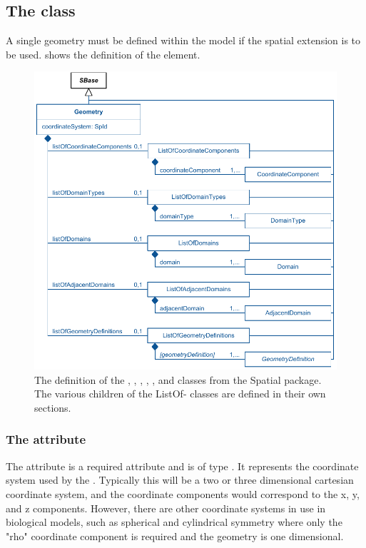 \subsection{The  class}
\label{Geometry-class}
\label{ListOfCoordinateComponents-class}
\label{ListOfDomainTypes-class}
\label{ListOfDomains-class}
\label{ListOfAdjacentDomains-class}
\label{ListOfGeometryDefinitions-class}

A single geometry must be defined within the model if the spatial extension is to be used.  shows the definition of the \Geometry element.
 
\begin{figure}[ht]
  \includegraphics{figs/Geometry-uml}
  \caption{The definition of the \Geometry, \ListOfCoordinateComponents, \ListOfDomainTypes, \ListOfDomains, \ListOfAdjacentDomains, and \ListOfGeometryDefinitions classes from the Spatial package.  The various children of the ListOf- classes are defined in their own sections.}
  \label{Geometry-uml}
  \label{ListOfCoordinateComponents-uml}
  \label{ListOfDomainTypes-uml}
  \label{ListOfDomains-uml}
  \label{ListOfAdjacentDomains-uml}
  \label{ListOfGeometryDefinitions-uml}
\end{figure}

\subsubsection{The  attribute}
The  attribute is a required attribute and is of type . It represents the coordinate system used by the \Geometry.  Typically this will be a two or three dimensional cartesian coordinate system, and the coordinate components would correspond to the x, y, and z components.  However, there are other coordinate systems in use in biological models, such as spherical and cylindrical symmetry where only the "rho" coordinate component is required and the geometry is one dimensional.

